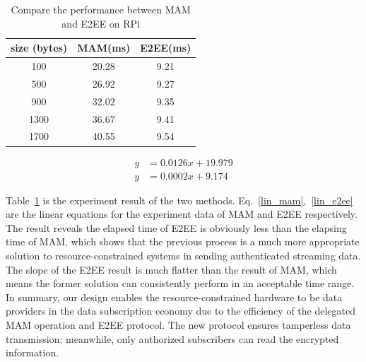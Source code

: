 \documentclass[10pt, conference, compsocconf]{IEEEtran}
\begin{document}
\begin{table}[htbp]
    \caption{Compare the performance between MAM and E2EE on RPi}
    \label{tab:mam_vs_e2ee}
    \centering
        \begin{tabular}{|c||c|c|}
        \hline
            \textbf{size (bytes)} & \textbf{MAM(ms)} & \textbf{E2EE(ms)} \\
            \hline
            100 & 20.28 & 9.21 \\
            500 &  26.92 & 9.27 \\
            900 & 32.02 &  9.35  \\
            1300 & 36.67 & 9.41 \\
            1700 & 40.55 & 9.54 \\
            \hline
        \end{tabular}
\end{table}

\begin{align}
    y &= 0.0126 x+19.979 \label{lin_mam} \\
    y &= 0.0002 x+9.174 \label{lin_e2ee}
\end{align}

Table~\ref{tab:mam_vs_e2ee} is the experiment result of the two methods. Eq.~\ref{lin_mam},~\ref{lin_e2ee} are the linear equations for the experiment data of MAM and E2EE respectively. The result reveals the elapsed time of E2EE is obviously less than the elapsing time of MAM, which shows that the previous process is a much more appropriate solution to resource-constrained systems in sending authenticated streaming data. The slope of the E2EE result is much flatter than the result of MAM, which means the former solution can consistently perform in an acceptable time range. In summary, our design enables the resource-constrained hardware to be data providers in the data subscription economy due to the efficiency of the delegated MAM operation and E2EE protocol. The new protocol ensures tamperless data transmission; meanwhile, only authorized subscribers can read the encrypted information.
\end{document}
